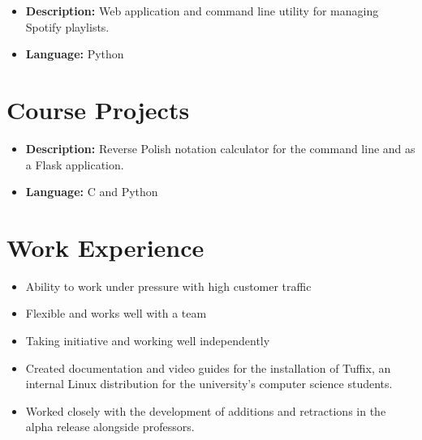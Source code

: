 \documentclass[10pt]{article}
\begin{document}
\noindent{}\textbox{\hfil\hfil}
\begin{itemize}
  \item \textbf{Description:} Web application and command line utility for managing Spotify playlists.
  \item \textbf{Language:} Python
\end{itemize}

\section{Course Projects}

\noindent{}\textbox{\hfil\hfil}

\begin{itemize}
  \item \textbf{Description:} Reverse Polish notation calculator for the command line and as a Flask application.
  \item \textbf{Language:} C and Python
\end{itemize}

\section{Work Experience}

\noindent{}\textbox{\hfil\hfil}

\begin{itemize}
  \item Ability to work under pressure with high customer traffic
  \item Flexible and works well with a team
  \item Taking initiative and working well independently 
\end{itemize}

\noindent{}\textbox{\hfil\hfil}

\begin{itemize}
  \item Created documentation and video guides for the installation of Tuffix, an internal Linux distribution for the university's computer science students.
  \item Worked closely with the development of additions and retractions in the alpha release alongside professors.
\end{itemize}
\end{document}
